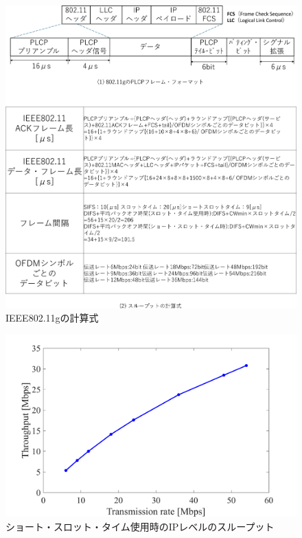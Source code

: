 \documentclass[a4paper,10.5pt]{ltjsarticle}
\begin{document}
\clearpage
\begin{figure}[H]
  \centering
  \includegraphics[width=\linewidth]{11g_frameformat.pdf} %
  \caption{IEEE802.11gの計算式}
  \label{fig:11g_frameformat} %
\end{figure}
\clearpage
\begin{figure}[H]
  \centering
  \includegraphics[width=\linewidth]{g_throughput.pdf} %
  \caption{ショート・スロット・タイム使用時のIPレベルのスループット}
  \label{fig:11g_throughput} %
\end{figure}
\end{document}
